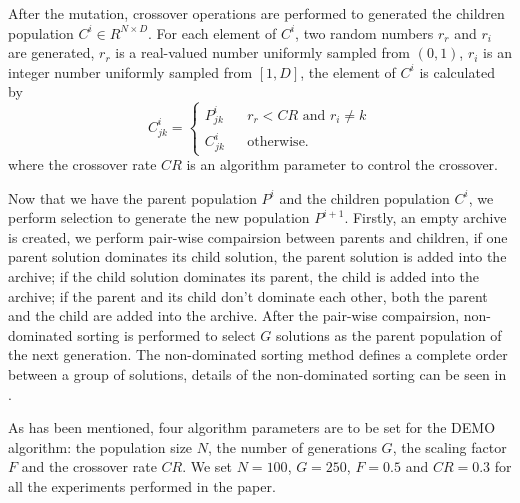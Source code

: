 After the mutation, crossover operations are performed to generated the children population $C^i \in R^{N \times D}$. For each element of $C^i$, two random numbers $r_r$ and $r_i$ are generated, $r_r$ is a real-valued number uniformly sampled from $(0, 1)$, $r_i$ is an integer number uniformly sampled from $[1, D]$, the element of $C^i$ is calculated by
\begin{equation}
    \label{eq:DEMO_crossover}
    C^i_{jk} = \left\{
        \begin{array}{lll}
            P^i_{jk} & & r_r < \mathit{CR} \text{ and } r_i \neq k \\
            C^i_{jk} & & \text{otherwise}.
        \end{array}
    \right.
\end{equation}
where the crossover rate $\mathit{CR}$ is an algorithm parameter to control the crossover.

Now that we have the parent population $P^i$ and the children population $C^i$,
we perform selection to generate the new population $P^{i+1}$. Firstly, an
empty archive is created, we perform pair-wise compairsion between parents and
children, if one parent solution dominates its child solution, the parent
solution is added into the archive; if the child solution dominates its parent,
the child is added into the archive; if the parent and its child don't dominate
each other, both the parent and the child are added into the archive. After
the pair-wise compairsion, non-dominated sorting\cite{nsgaii} is
performed to select $G$ solutions as the parent population of the next
generation. The non-dominated sorting method defines a complete order between a
group of solutions, details of the non-dominated sorting can be seen in
\cite{nsgaii}.

As has been mentioned, four algorithm parameters are to be set for the DEMO algorithm: the population size $N$, the number of generations $G$, the scaling factor $F$ and the crossover rate $\mathit{CR}$. We set $N = 100$, $G = 250$, $F = 0.5$ and $\mathit{CR} = 0.3$ for all the experiments performed in the paper. 
